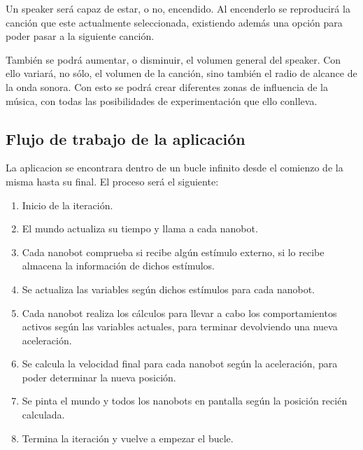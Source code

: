Un speaker será capaz de estar, o no, encendido. Al encenderlo se reproducirá la canción que este actualmente seleccionada, existiendo además una opción para poder pasar a la siguiente canción.
 
También se podrá aumentar, o disminuir, el volumen general del speaker. Con ello variará, no sólo, el volumen de la canción, sino también el radio de alcance de la onda sonora. Con esto se podrá crear diferentes zonas de influencia de la música, con todas las posibilidades de experimentación que ello conlleva.

\subsection{Flujo de trabajo de la aplicación}
La aplicacion se encontrara dentro de un bucle infinito desde el comienzo de la misma hasta su final. El proceso será el siguiente:
\begin{enumerate}
 \item Inicio de la iteración.
 \item El mundo actualiza su tiempo y llama a cada nanobot.
 \item Cada nanobot comprueba si recibe algún estímulo externo, si lo recibe almacena la información de dichos estímulos.
 \item Se actualiza las variables según dichos estímulos para cada nanobot.
 \item Cada nanobot realiza los cálculos para llevar a cabo los comportamientos activos según las variables actuales, para terminar devolviendo una nueva aceleración.
 \item Se calcula la velocidad final para cada nanobot según la aceleración, para poder determinar la nueva posición.
 \item Se pinta el mundo y todos los nanobots en pantalla según la posición recién calculada.
 \item Termina la iteración y vuelve a empezar el bucle.
\end{enumerate}

 





